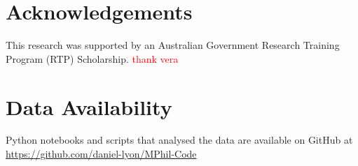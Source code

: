 \section*{Acknowledgements}
This research was supported by an Australian Government Research Training Program (RTP) Scholarship. \textcolor{red}{thank vera}

\section*{Data Availability}
Python notebooks and scripts that analysed the data are available on GitHub at \url{https://github.com/daniel-lyon/MPhil-Code}



